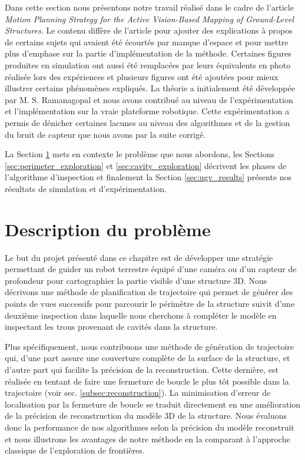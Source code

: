 ﻿%
\label{sec:ugv}

Dans cette section nous présentons notre travail réalisé dans le cadre de l'article \textit{Motion Planning Strategy for the Active Vision-Based Mapping of Ground-Level Structures}. Le contenu diffère de l'article pour ajouter des explications à propos de certains sujets qui avaient été écourtés par manque d'espace et pour mettre plus d'emphase sur la partie d'implémentation de la méthode. Certaines figures produites en simulation ont aussi été remplacées par leurs équivalents en photo réalisée lors des expériences et plusieurs figures ont été ajoutées pour mieux illustrer certains phénomènes expliqués. La théorie a initialement été développée par M. S. Ramanagopal et nous avons contribué au niveau de l'expérimentation et l'implémentation sur la vraie plateforme robotique. Cette expérimentation a permis de dénicher certaines lacunes au niveau des algorithmes et de la gestion du bruit de capteur que nous avons par la suite corrigé.

La Section \ref{sec:ugv_problem_description} mets en contexte le problème que nous abordons, les Sections \ref{sec:perimeter_exploration} et \ref{sec:cavity_exploration} décrivent les phases de l'algorithme d'inspection et finalement la Section \ref{sec:ugv_results} présente nos résultats de simulation et d'expérimentation.

\section{Description du problème} \label{sec:ugv_problem_description}

Le but du projet présenté dans ce chapitre est de développer une stratégie permettant de guider un robot terrestre équipé d'une caméra ou d'un capteur de profondeur pour cartographier la partie visible d'une structure 3D. Nous décrivons une méthode de planification de trajectoire qui permet de générer des points de vues successifs pour parcourir le périmètre de la structure suivit d'une deuxième inspection dans laquelle nous cherchons à compléter le modèle en inspectant les trous provenant de cavités dans la structure. 

Plus spécifiquement, nous contribuons une méthode de génération de trajectoire qui, d'une part assure une couverture complète de la surface de la structure, et d'autre part qui facilite la précision de la reconstruction. Cette dernière, est réalisée en tentant de faire une fermeture de boucle le plus tôt possible dans la trajectoire (voir sec. \ref{subsec:reconstruction}). La minimisation d'erreur de localisation par la fermeture de boucle se traduit directement en une amélioration de la précision de reconstruction du modèle 3D de la structure. Nous évaluons donc la performance de nos algorithmes selon la précision du modèle reconstruit et nous illustrons les avantages de notre méthode en la comparant à l'approche classique de l'exploration de frontières.

